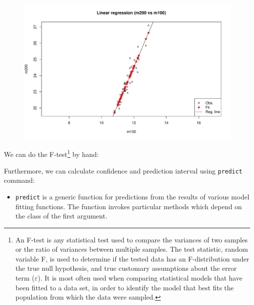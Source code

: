\documentclass[a4paper]{article}
\begin{document}
    \newpage

    \begin{figure}[!htp]
        \centering
        \includegraphics[width=\textwidth]{img/example-analysis-of-quantitative-data-5.pdf}
    \end{figure}

    \noindent
    We can do the F-test\footnote{An F-test is any statistical test used to compare the variances of two samples or the ratio of variances between multiple samples. The test statistic, random variable F, is used to determine if the tested data has an F-distribution under the true null hypothesis, and true customary assumptions about the error term ($\varepsilon$). It is most often used when comparing statistical models that have been fitted to a data set, in order to identify the model that best fits the population from which the data were sampled.} by hand:
    
    Furthermore, we can calculate confidence and prediction interval using \texttt{predict} command:
    \begin{itemize}
        \item \texttt{predict} is a generic function for predictions from the results of various model fitting functions. The function invokes particular methods which depend on the class of the first argument.
    \end{itemize}

    \newpage

    
    
    \newpage
\end{document}
